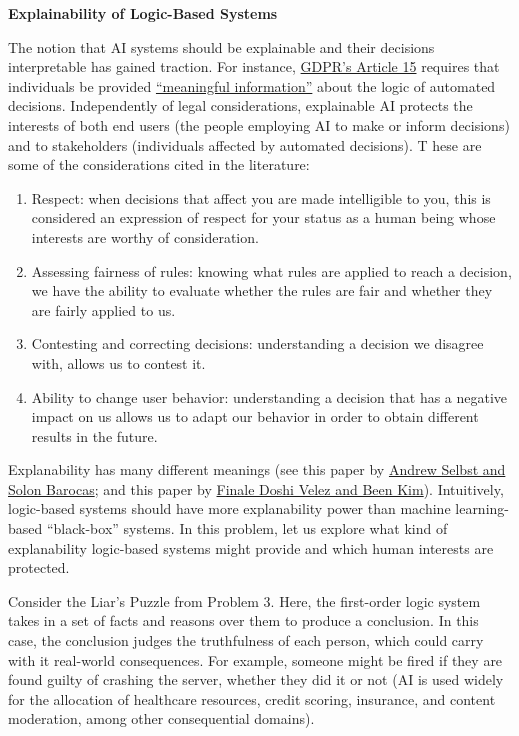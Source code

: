 \item {\bf Explainability of Logic-Based Systems}

The notion that AI systems should be explainable and their decisions interpretable has gained traction. 
For instance, \href{https://gdpr-text.com/read/article-15/#related_gdpr-a-15_1h}{GDPR’s Article 15} requires that individuals be provided 
\href{https://academic.oup.com/idpl/article/7/4/233/4762325}{“meaningful information”} about the logic of automated decisions. 
Independently of legal considerations, explainable AI protects the interests of both end users 
(the people employing AI to make or inform decisions) and to stakeholders (individuals affected by automated decisions). T
hese are some of the considerations cited in the literature:

\begin{enumerate}
  \item Respect: when decisions that affect you are made intelligible to you, this is considered an expression of respect for your 
  status as a human being whose interests are worthy of consideration.
  \item Assessing fairness of rules: knowing what rules are applied to reach a decision, we have the ability to evaluate whether the 
  rules are fair and whether they are fairly applied to us.
  \item Contesting and correcting decisions: understanding a decision we disagree with, allows us to contest it.
  \item Ability to change user behavior: understanding a decision that has a negative impact on us allows us to adapt our 
  behavior in order to obtain different results in the future.
\end{enumerate}


Explanability has many different meanings (see this paper by 
\href{https://ir.lawnet.fordham.edu/cgi/viewcontent.cgi?article=5569&context=flr}{Andrew Selbst and Solon Barocas}; and this paper by 
\href{https://arxiv.org/pdf/1702.08608.pdf}{Finale Doshi Velez and Been Kim}). Intuitively, logic-based systems should have more explanability power 
than machine learning-based “black-box” systems.  In this problem, let us explore what kind of explanability logic-based systems might 
provide and which human interests are protected.

Consider the Liar’s Puzzle from Problem 3.  Here, the first-order logic system takes in a set of facts and reasons over them to produce a conclusion. 
In this case, the conclusion judges the truthfulness of each person, which could carry with it real-world consequences. 
For example, someone might be fired if they are found guilty of crashing the server, whether they did it or not 
(AI is used widely for the allocation of healthcare resources, credit scoring, insurance, and content moderation, among other consequential domains).


\begin{enumerate}

  
  
  
  
\end{enumerate}
